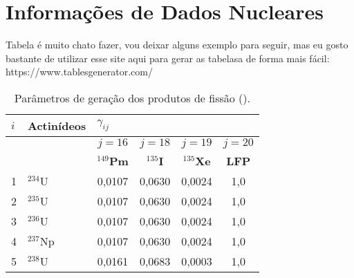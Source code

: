 \chapter{Informações de Dados Nucleares}
\label{apendice}

Tabela é muito chato fazer, vou deixar alguns exemplo para seguir, mas eu gosto bastante de utilizar esse site aqui para gerar as tabelasa de forma mais fácil: https://www.tablesgenerator.com/


\begin{table}[H]
\centering
\caption{Parâmetros de geração dos produtos de fissão (\cite{belo2022}).} \label{tab:generationPF} \vspace{0.5cm}
\begin{tabular}{llcccc}
\hline
\textbf{$i$} & \textbf{Actinídeos} & \multicolumn{1}{l}{\textbf{$\gamma_{ij}$}} & \multicolumn{1}{l}{\textbf{}} & \multicolumn{1}{l}{\textbf{}} & \multicolumn{1}{l}{\textbf{}} \\ \hline
\textbf{}    & \textbf{}           & \textbf{$j = 16$}                          & \textbf{$j = 18$}             & \textbf{$j = 19$}             & \textbf{$j = 20$}             \\
\textbf{}    & \textbf{}           & \textbf{$^{149}$Pm}                      & \textbf{$^{135}$I}          & \textbf{$^{135}$Xe}         & \textbf{LFP}                \\ \hline
1            & $^{234}$U           & 0,0107                                     & 0,0630                        & 0,0024                        & 1,0                           \\
2            & $^{235}$U           & 0,0107                                     & 0,0630                        & 0,0024                        & 1,0                           \\
3            & $^{236}$U           & 0,0107                                     & 0,0630                        & 0,0024                        & 1,0                           \\
4            & $^{237}$Np          & 0,0107                                     & 0,0630                        & 0,0024                        & 1,0                           \\
5            & $^{238}$U           & 0,0161                                     & 0,0683                        & 0,0003                        & 1,0                           \\

\end{tabular}
\end{table}
